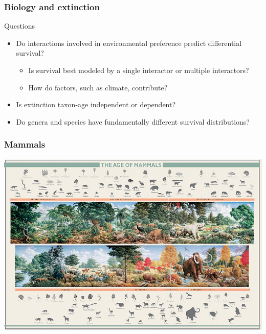 \documentclass{beamer}
\begin{document}
\begin{frame}
  \frametitle{Biology and extinction}

  \begin{block}{Questions}
    \begin{itemize}
      \item Do interactions involved in environmental preference predict differential survival?
        \begin{itemize}
          \item Is survival best modeled by a single interactor or multiple interactors? 
          \item How do factors, such as climate, contribute? 
        \end{itemize}
      \item Is extinction taxon-age independent or dependent?
      \item Do genera and species have fundamentally different survival distributions?
    \end{itemize}
  \end{block}
\end{frame}

\begin{frame}
  \frametitle{Mammals}
  \includegraphics[height = 0.9\textheight, width = \textwidth, keepaspectratio = true]{figure/aom}

  \tiny{}
\end{frame}
\end{document}
